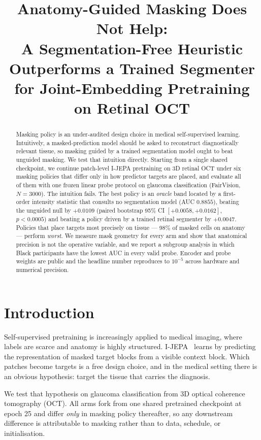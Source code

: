 \documentclass{article}
\title{Anatomy-Guided Masking Does Not Help:\\
A Segmentation-Free Heuristic Outperforms a Trained Segmenter\\
for Joint-Embedding Pretraining on Retinal OCT}
\author{}
\begin{document}
\maketitle

\begin{abstract}
Masking policy is an under-audited design choice in medical self-supervised
learning. Intuitively, a masked-prediction model should be asked to reconstruct
diagnostically relevant tissue, so masking guided by a trained segmentation
model ought to beat unguided masking. We test that intuition directly. Starting
from a single shared checkpoint, we continue patch-level I-JEPA pretraining on
3D retinal OCT under six masking policies that differ only in how predictor
targets are placed, and evaluate all of them with one frozen linear probe
protocol on glaucoma classification (FairVision, $N{=}3000$).
The intuition fails. The best policy is an \emph{oracle} band located by a
first-order intensity statistic that consults no segmentation model
(AUC $0.8855$), beating the unguided null by $+0.0109$
(paired bootstrap 95\% CI $[+0.0058, +0.0162]$, $p<0.0005$) and beating a
policy driven by a trained retinal segmenter by $+0.0047$. Policies that place
targets most precisely on tissue --- $98\%$ of masked cells on anatomy ---
perform \emph{worst}. We measure mask geometry for every arm and show that
anatomical precision is not the operative variable, and we report a subgroup
analysis in which Black participants have the lowest AUC in every valid probe.
Encoder and probe weights are public and the headline number reproduces to
$10^{-5}$ across hardware and numerical precision.
\end{abstract}

\section{Introduction}

Self-supervised pretraining is increasingly applied to medical imaging, where
labels are scarce and anatomy is highly structured. I-JEPA~\citep{assran2023ijepa}
learns by predicting the representation of masked target blocks from a visible
context block. Which patches become targets is a free design choice, and in the
medical setting there is an obvious hypothesis: target the tissue that carries
the diagnosis.

We test that hypothesis on glaucoma classification from 3D optical coherence
tomography (OCT). All arms fork from one shared pretrained checkpoint at epoch
25 and differ \emph{only} in masking policy thereafter, so any downstream
difference is attributable to masking rather than to data, schedule, or
initialisation.
\end{document}
